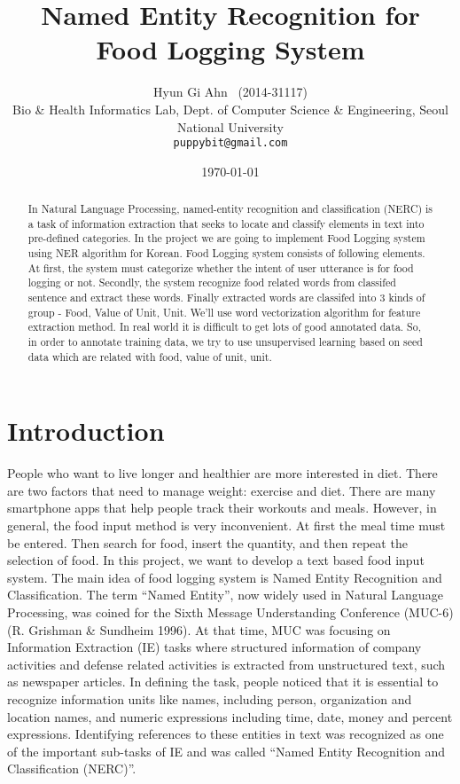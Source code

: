\documentclass[11pt,a4paper]{article}
\title{Named Entity Recognition for Food Logging System}
\author{Hyun Gi Ahn \ (2014-31117) \\
  Bio \& Health Informatics Lab, Dept. of Computer Science \& Engineering, Seoul National University \\
  {\tt puppybit@gmail.com} \\}
\date{\today}
\begin{document}
\maketitle
\begin{abstract}
  In Natural Language Processing, named-entity recognition and classification (NERC) is a task of information extraction that seeks to locate and classify elements in text into pre-defined categories. In the project we are going to implement Food Logging system using NER algorithm for Korean. Food Logging system consists of following elements. At first, the system must categorize whether the intent of user utterance is for food logging or not. Secondly, the system recognize food related words from classifed sentence and extract these words. Finally extracted words are classifed into 3 kinds of group - Food, Value of Unit, Unit. We'll use word vectorization algorithm for feature extraction method. In real world it is difficult to get lots of good annotated data. So, in order to annotate training data, we try to use unsupervised learning based on seed data which are related with food, value of unit, unit.
\end{abstract}

\section{Introduction}

People who want to live longer and healthier are more interested in diet. There are two factors that need to manage weight: exercise and diet. There are many smartphone apps that help people track their workouts and meals. However, in general, the food input method is very inconvenient. At first the meal time must be entered. Then search for food, insert the quantity, and then repeat the selection of food. In this project, we want to develop a text based food input system.
The main idea of food logging system is Named Entity Recognition and Classification. The term “Named Entity”, now widely used in Natural Language Processing, was coined for the Sixth Message Understanding Conference (MUC-6) (R. Grishman \& Sundheim 1996). At that time, MUC was focusing on Information Extraction (IE) tasks where structured information of company activities and defense related activities is extracted from unstructured text, such as newspaper articles. In defining the task, people noticed that it is essential to recognize information units like names, including person, organization and location names, and numeric expressions including time, date, money and percent expressions. Identifying references to these entities in text was recognized as one of the important sub-tasks of IE and was called “Named Entity Recognition and Classification (NERC)”.
\end{document}
